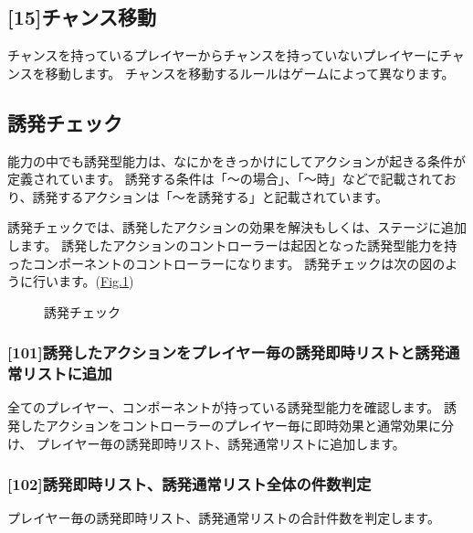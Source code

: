 \documentclass[letterpaper,10pt,dvipdfmx]{sphinxmanual}
\begin{document}
\subsection{{[}15{]}チャンス移動}
\label{\detokenize{core/core:id28}}
\sphinxAtStartPar
チャンスを持っているプレイヤーからチャンスを持っていないプレイヤーにチャンスを移動します。
チャンスを移動するルールはゲームによって異なります。


\subsection{誘発チェック}
\label{\detokenize{core/core:trigger-check}}\label{\detokenize{core/core:id29}}
\sphinxAtStartPar
能力の中でも誘発型能力は、なにかをきっかけにしてアクションが起きる条件が定義されています。
誘発する条件は「〜の場合」、「〜時」などで記載されており、誘発するアクションは「〜を誘発する」と記載されています。

\sphinxAtStartPar
誘発チェックでは、誘発したアクションの効果を解決もしくは、ステージに追加します。
誘発したアクションのコントローラーは起因となった誘発型能力を持ったコンポーネントのコントローラーになります。
誘発チェックは次の図のように行います。(\hyperref[\detokenize{core/core:trigger-flow}]{Fig.\@ \ref{\detokenize{core/core:trigger-flow}}})

\begin{figure}[htbp]
\centering
\capstart

\noindent{}
\caption{誘発チェック}\label{\detokenize{core/core:id47}}\label{\detokenize{core/core:trigger-flow}}\end{figure}


\subsubsection{{[}10\sphinxhyphen{}1{]}誘発したアクションをプレイヤー毎の誘発即時リストと誘発通常リストに追加}
\label{\detokenize{core/core:trigger-act-gather}}\label{\detokenize{core/core:id30}}
\sphinxAtStartPar
全てのプレイヤー、コンポーネントが持っている誘発型能力を確認します。
誘発したアクションをコントローラーのプレイヤー毎に即時効果と通常効果に分け、
プレイヤー毎の誘発即時リスト、誘発通常リストに追加します。


\subsubsection{{[}10\sphinxhyphen{}2{]}誘発即時リスト、誘発通常リスト全体の件数判定}
\label{\detokenize{core/core:id31}}
\sphinxAtStartPar
プレイヤー毎の誘発即時リスト、誘発通常リストの合計件数を判定します。
\end{document}
